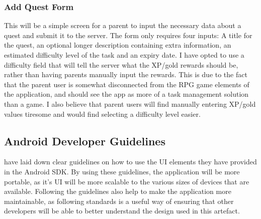 \subsubsection{Add Quest Form}
This will be a simple screen for a parent to input the necessary data about a quest and submit it to the server. 
The form only requires four inputs: A title for the quest, an optional longer description containing extra information, an estimated difficulty level of the task and an expiry date.
I have opted to use a difficulty field that will tell the server what the XP/gold rewards should be, rather than having parents manually input the rewards.
This is due to the fact that the parent user is somewhat disconnected from the RPG game elements of the application, and should see the app as more of a task management solution than a game.
I also believe that parent users will find manually entering XP/gold values tiresome and would find selecting a difficulty level easier. 

\subsection{Android Developer Guidelines}
\cite{materialdesignguidelines} have laid down clear guidelines on how to use the UI elements they have provided in the Android SDK.
By using these guidelines, the application will be more portable, as it's UI will be more scalable to the various sizes of devices that are available.
Following the guidelines also help to make the application more maintainable, as following standards is a useful way of ensuring that other developers will be able to better understand the design used in this artefact.